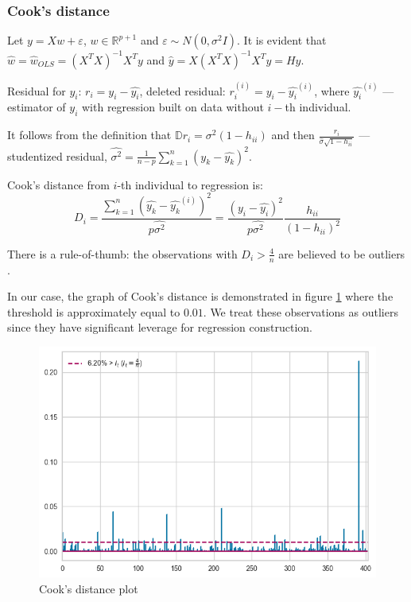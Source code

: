 \documentclass[12pt, bachelor, substylefile = algo_title.rtx]{disser}
\theoremstyle{definition}
\begin{document}
\subsubsection{Cook's distance}

Let $y = X w + \varepsilon$, $w \in \mathbb{R}^{p+1}$ and $\varepsilon \sim N(0, \sigma^2 I)$. It is evident that $\widehat{w}= \widehat{w}_{OLS} = (X^TX)^{-1}X^Ty$ and $\widehat{y} = X(X^TX)^{-1}X^Ty = Hy$.

Residual for $y_i$: $r_i = y_i - \widehat{y_i}$, deleted residual: $r_i^{(i)} = y_i - \widehat{y_i}^{(i)}$, where $\widehat{y_i}^{(i)}$ --- estimator of $y_i$ with regression built on data without $i-$th individual.

It follows from the definition that $\mathbb{D}r_i = \sigma^2(1-h_{ii})$ and then $\frac{r_{i}}{\widehat{\sigma}\sqrt{1-h_{ii}}}$ --- studentized residual, $\widehat{\sigma^2}=\frac{1}{n-p}\sum_{k=1}^n(y_k-\widehat{y_k})^2$.

Cook's distance from $i$-th individual to regression is:
$$ D_i = \frac{\sum_{k=1}^n(\widehat{y_k}-\widehat{y_k}^{(i)})^2}{p\widehat{\sigma^2}} = \frac{(y_i-\widehat{y_i})^2}{p\widehat{\sigma^2}} \frac{h_{ii}}{(1-h_{ii})^2} $$

There is a rule-of-thumb: the observations with $D_i > \frac{4}{n}$ are believed to be outliers \cite{fox91}.

In our case, the graph of Cook's distance is demonstrated in figure \ref{fig: 13} where the threshold is approximately equal to $0.01$. We treat these observations as outliers since they have significant leverage for regression construction.

\begin{figure}[!h]
\centering
   \begin{minipage}{0.7\textwidth}
     \includegraphics[width=\linewidth]{cook}
   \end{minipage}
\caption{Cook's distance plot}
\label{fig: 13}
\end{figure}
\end{document}
